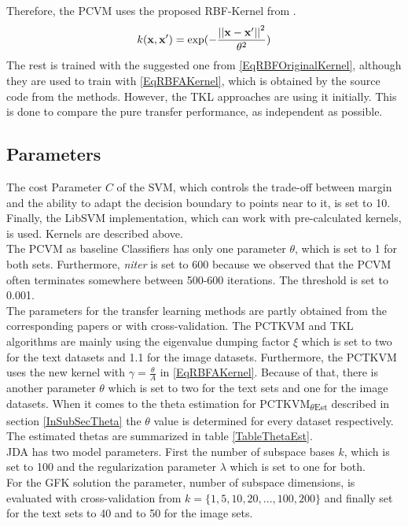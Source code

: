 Therefore, the \acs{PCVM} uses the proposed \acs{RBF}-Kernel from \cite{Chen.2009}. 
\begin{equation}\label{RBFKernelPCVM}
k(\mathbf{x},\mathbf{x'}) = \exp(-\frac{\left\vert\left\vert\mathbf{x}-\mathbf{x'}\right\vert\right\vert^2}{\theta^2})
\end{equation}
The rest is trained with the suggested one from \eqref{EqRBFOriginalKernel}, although they are used to train with \eqref{EqRBFAKernel}, which is obtained by the source code from the methods.
However, the \acs{TKL} approaches are using it initially.
This is done to compare the pure transfer performance, as independent as possible.

\subsection{Parameters}
The cost Parameter $C$ of the \acs{SVM}, which controls the trade-off between margin and the ability to adapt the decision boundary to points near to it\cite[p. 421-422]{TrevorHastie.2009}, is set to 10.
Finally, the LibSVM implementation, which can work with pre-calculated kernels, is used. Kernels are described above.\\
The PCVM as baseline Classifiers has only one parameter $\theta$, which is set to 1 for both sets.
Furthermore, \textit{niter} is set to 600 because we observed that the \acs{PCVM} often terminates somewhere between 500-600 iterations. The threshold is set to 0.001.\\
The parameters for the transfer learning methods are partly obtained from the corresponding papers or with cross-validation. 
The \acs{PCTKVM} and \acs{TKL} algorithms are mainly using the eigenvalue dumping factor $\xi$ which is set to two for the text datasets and 1.1 for the image datasets.\cite{Long.2015}
Furthermore, the \acs{PCTKVM} uses the new kernel with $\gamma=\frac{\theta}{A}$ in \eqref{EqRBFAKernel}.
Because of that, there is another parameter $\theta$ which is set to two for the text sets and one for the image datasets.
When it comes to the theta estimation for \acs{PCTKVM}\textsubscript{$\theta$Est} described in section \ref{InSubSecTheta} the $\theta$ value is determined for every dataset respectively.
The estimated thetas are summarized in table \ref{TableThetaEst}. \\
\acs{JDA} has two model parameters.
First the number of subspace bases $k$, which is set to 100 and the regularization parameter $\lambda $ which is set to one for both.\cite{Long.}\\
For the \acs{GFK} solution the parameter, number of subspace dimensions, is evaluated with cross-validation from $k=\{1,5,10,20,...,100,200\}$ and finally set for the text sets to 40 and to 50 for the image sets.\\
